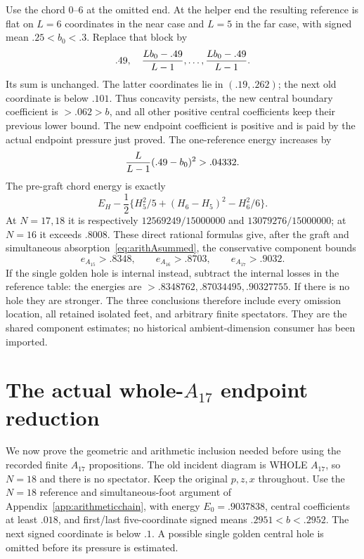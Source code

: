 \documentclass[11pt]{article}
\begin{document}
Use the chord \(0\)--\(6\) at the omitted end.
At the helper end the resulting reference is flat on \(L=6\)
coordinates in the near case and \(L=5\) in the far case,
with signed mean \(.25<b_0<.3\).
Replace that block by
\[
             .49,\quad
             {Lb_0-.49\over L-1},\ldots,
             {Lb_0-.49\over L-1}.
\]
Its sum is unchanged.  The latter coordinates lie in
\((.19,.262)\); the next old coordinate is below \(.101\).
Thus concavity persists, the new central boundary coefficient
is \(>.062>b\), and all other positive central coefficients
keep their previous lower bound.
The new endpoint coefficient is positive and is paid by the
actual endpoint pressure just proved.
The one-reference energy increases by
\[
                {L\over L-1}(.49-b_0)^2>.04332 .
\]
The pre-graft chord energy is exactly
\[
 E_H-\frac12\{H_5^2/5+(H_6-H_5)^2-H_6^2/6\}.
\]
At \(N=17,18\) it is respectively
\(12569249/15000000\) and \(13079276/15000000\);
at \(N=16\) it exceeds \(.8008\).
These direct rational formulas give, after the graft and
simultaneous absorption~\eqref{eq:arithAsummed}, the conservative
component bounds
\[
                 e_{A_{15}}>.8348,\qquad
                 e_{A_{16}}>.8703,\qquad
                 e_{A_{17}}>.9032 .
\]
If the single golden hole is internal instead, subtract the
internal losses in the reference table:
the energies are \(>.8348762,.87034495,.90327755\).
If there is no hole they are stronger.
The three conclusions therefore include every omission location,
all retained isolated feet, and arbitrary finite spectators.
They are the shared component estimates; no historical
ambient-dimension consumer has been imported.

\section{The actual whole-\(A_{17}\) endpoint reduction}
\label{app:wholearithA17}

We now prove the geometric and arithmetic inclusion needed before
using the recorded finite \(A_{17}\) propositions.
The old incident diagram is WHOLE \(A_{17}\), so \(N=18\) and
there is no spectator.
Keep the original \(p,z,x\) throughout.
Use the \(N=18\) reference and simultaneous-foot argument of
Appendix~\ref{app:arithmeticchain}, with energy
\(E_0=.9037838\), central coefficients at least \(.018\),
and first/last five-coordinate signed means
\(.2951<b<.2952\).
The next signed coordinate is below \(.1\).
A possible single golden central hole is omitted before its
pressure is estimated.
\end{document}

